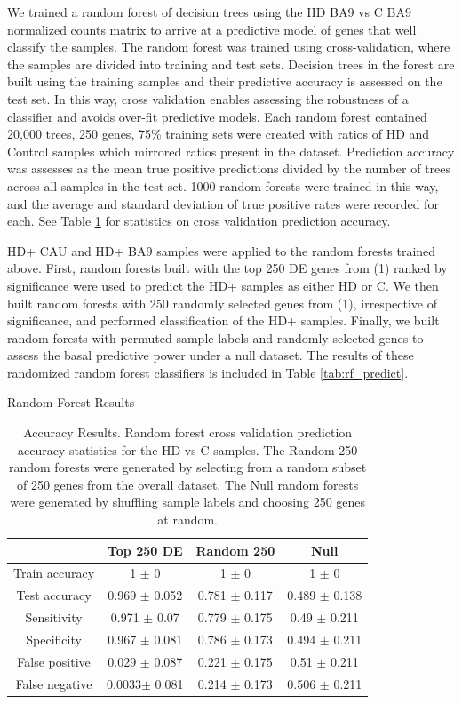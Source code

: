\documentclass[fleqn,10pt,table]{wlscirep}
\begin{document}
We trained a random forest of decision trees using the HD BA9 vs C BA9 normalized counts matrix to arrive at a predictive model of genes that well classify the samples.
The random forest was trained using cross-validation, where the samples are divided into training and test sets.
Decision trees in the forest are built using the training samples and their predictive accuracy is assessed on the test set.
In this way, cross validation enables assessing the robustness of a classifier and avoids over-fit predictive models.
Each random forest contained 20,000 trees, 250 genes, 75\% training sets were created with ratios of HD and Control samples which mirrored ratios present in the dataset.
Prediction accuracy was assesses as the mean true positive predictions divided by the number of trees across all samples in the test set.
1000 random forests were trained in this way, and the average and standard deviation of true positive rates were recorded for each.
See Table \ref{tab:random_forest_cross_val} for statistics on cross validation prediction accuracy.

HD+ CAU and HD+ BA9 samples were applied to the random forests trained above.
First, random forests built with the top 250 DE genes from (1) ranked by significance were used to predict the HD+ samples as either HD or C.
We then built random forests with 250 randomly selected genes from (1), irrespective of significance, and performed classification of the HD+ samples.
Finally, we built random forests with permuted sample labels and randomly selected genes to assess the basal predictive power under a null dataset.
The results of these randomized random forest classifiers is included in Table \ref{tab:rf_predict}.

\begin{table}[ht]
\caption{Random Forest Results}
\centering
\begin{tabular}{cccc} \hline
					& Top 250 DE 		& Random 250	& Null	\\ \hline
Train accuracy		& 1	$\pm$ 0			& 1	$\pm$ 0		& 1	$\pm$ 0				\\ 
Test accuracy		& 0.969	$\pm$ 0.052	& 0.781 $\pm$ 0.117		& 0.489 $\pm$ 0.138		\\ 
Sensitivity			& 0.971	$\pm$ 0.07	& 0.779	$\pm$ 0.175		& 0.49 $\pm$ 0.211		\\ 
Specificity			& 0.967	$\pm$ 0.081	& 0.786	$\pm$ 0.173		& 0.494 $\pm$ 0.211		\\ 
False positive		& 0.029	$\pm$ 0.087	& 0.221	$\pm$ 0.175		& 0.51 $\pm$ 0.211		\\ 
False negative		& 0.0033$\pm$ 0.081	& 0.214	$\pm$ 0.173		& 0.506 $\pm$ 0.211		\\ \hline
\end{tabular}
\caption{Accuracy Results.
Random forest cross validation prediction accuracy statistics for the HD vs C samples.
The Random 250 random forests were generated by selecting from a random subset of 250 genes from the overall dataset.
The Null random forests were generated by shuffling sample labels and choosing 250 genes at random.
}
\label{tab:random_forest_cross_val}
\end{table}
\end{document}
